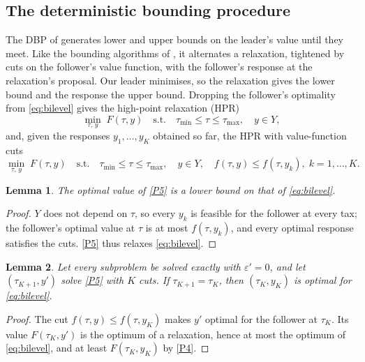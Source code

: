 \documentclass[review,11pt,nonatbib]{elsarticle}
\newtheorem{lemma}{Lemma}
\theoremstyle{remark}
\newcommand{\tmin}{\tau_{\min}}
\newcommand{\tmax}{\tau_{\max}}
\begin{document}
\subsection{The deterministic bounding procedure}\label{sec:dbp}

The DBP of \textcite{soares2021deterministic} generates lower and upper bounds on the leader's value until they meet. Like the bounding algorithms of \textcite{mitsos2008global,mitsos2010global}, it alternates a relaxation, tightened by cuts on the follower's value function, with the follower's response at the relaxation's proposal. Our leader minimises, so the relaxation gives the lower bound and the response the upper bound. Dropping the follower's optimality from \eqref{eq:bilevel} gives the high-point relaxation (HPR)
\begin{equation}
\min_{\tau,\, y} \; F(\tau, y) \quad \text{s.t.} \quad \tmin \le \tau \le \tmax, \quad y \in Y, \tag{P2}\label{P2}
\end{equation}
and, given the responses $y_1, \dots, y_K$ obtained so far, the HPR with value-function cuts
\begin{equation}
\min_{\tau,\, y} \; F(\tau, y) \quad \text{s.t.} \quad \tmin \le \tau \le \tmax, \quad y \in Y, \quad f(\tau, y) \le f(\tau, y_k), \; k = 1, \dots, K. \tag{P5}\label{P5}
\end{equation}

\begin{lemma}\label{lem:lb}
The optimal value of \eqref{P5} is a lower bound on that of \eqref{eq:bilevel}.
\end{lemma}
\begin{proof}
$Y$ does not depend on $\tau$, so every $y_k$ is feasible for the follower at every tax; the follower's optimal value at $\tau$ is at most $f(\tau, y_k)$, and every optimal response satisfies the cuts. \eqref{P5} thus relaxes \eqref{eq:bilevel}.
\end{proof}

\begin{lemma}\label{lem:stop}
Let every subproblem be solved exactly with $\varepsilon' = 0$, and let $(\tau_{K+1}, y')$ solve \eqref{P5} with $K$ cuts. If $\tau_{K+1} = \tau_K$, then $(\tau_K, y_K)$ is optimal for \eqref{eq:bilevel}.
\end{lemma}
\begin{proof}
The cut $f(\tau, y) \le f(\tau, y_K)$ makes $y'$ optimal for the follower at $\tau_K$. Its value $F(\tau_K, y')$ is the optimum of a relaxation, hence at most the optimum of \eqref{eq:bilevel}, and at least $F(\tau_K, y_K)$ by \eqref{P4}.
\end{proof}
\end{document}
